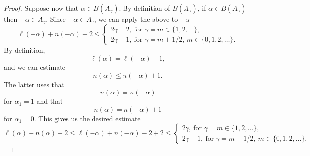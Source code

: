 \documentclass[11pt]{amsart}
\begin{document}
{\begin{proof}
Suppose now that $\alpha \in B(A_{\gamma})$. By definition of $B(A_{\gamma})$, if $\alpha \in B(A_{\gamma})$ then $-\alpha \in A_{\gamma}$. Since $-\alpha \in A_{\gamma}$, we can apply the above to $-\alpha$
\begin{equation*}
\ell(-\alpha) + n(-\alpha) - 2 \leq \begin{cases} 2 \gamma - 2,\ \text{for } \gamma = m \in \{1,2,\ldots \},\\ 2 \gamma - 1,\ \text{for } \gamma = m + 1/2,\ m \in \{0,1,2,\ldots \}. \end{cases}
\end{equation*}
By definition,
\begin{equation*}
\ell(\alpha) = \ell(-\alpha) - 1,
\end{equation*}
and we can estimate
\begin{equation*}
n(\alpha) \leq n(-\alpha)+1.
\end{equation*}
The latter uses that
\begin{equation*}
n(\alpha) = n(-\alpha)
\end{equation*}
for $\alpha_{1}=1$ and that
\begin{equation*}
n(\alpha) = n(-\alpha) +1
\end{equation*}
for $\alpha_{1} = 0$. This gives us the desired estimate
\begin{equation*}
\ell(\alpha) + n(\alpha) - 2 \leq \ell(-\alpha) + n(-\alpha) - 2 + 2 \leq \begin{cases} 2 \gamma,\ \text{for } \gamma = m \in \{1,2,\ldots \},\\ 2 \gamma + 1,\ \text{for } \gamma = m + 1/2,\ m \in \{0,1,2,\ldots \}. \end{cases}
\end{equation*}
\end{proof}

}
\end{document}
